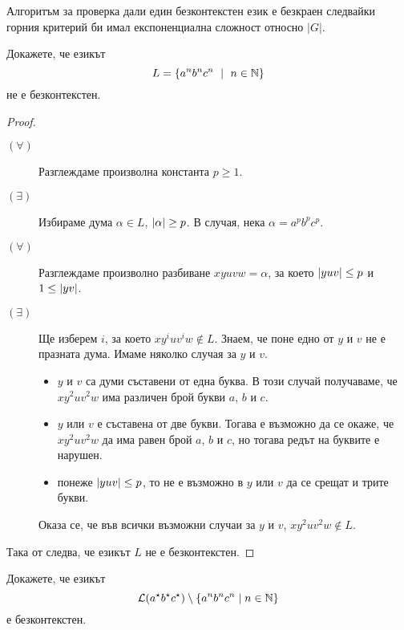 \begin{remark}
  Алгоритъм за проверка дали един безконтекстен език е безкраен следвайки горния критерий би 
  имал експоненциална сложност относно $|G|$.
\end{remark}

\begin{problem}
  \label{prob:anbncn}
  Докажете, че езикът 
  \[L = \{a^nb^nc^n\ \mid\ n\in\Nat\}\]
  не е безконтекстен.
\end{problem}
\begin{proof}
  \begin{description}
  \item[$(\forall)$]
    Разглеждаме произволна константа $p \geq 1$.
  \item[$(\exists)$]
    Избираме дума $\alpha \in L$, $\vert{\alpha}\vert \geq p$.
    В случая, нека $\alpha = a^pb^pc^p$.
  \item[$(\forall)$]
    Разглеждаме произволно разбиване $xyuvw = \alpha$, за което $\vert{yuv}\vert \leq p$ и $1 \leq \vert{yv}\vert$.
  \item[$(\exists)$]
    Ще изберем $i$, за което $xy^iuv^iw \not\in L$.
    Знаем, че поне едно от $y$ и $v$ не е празната дума.
    Имаме няколко случая за $y$ и $v$.
    \begin{itemize}
    \item
      $y$ и $v$ са думи съставени от една буква.
      В този случай получаваме, че $xy^2uv^2w$ има различен брой букви $a$, $b$ и $c$.
    \item
      $y$ или $v$ е съставена от две букви.
      Тогава е възможно да се окаже, че $xy^2uv^2w$ да има равен брой $a$, $b$ и $c$,
      но тогава редът на буквите е нарушен.
    \item
      понеже $\vert{yuv}\vert \leq p$, то не е възможно в $y$ или $v$ да се срещат и трите букви.
    \end{itemize}  
    Оказа се, че във всички възможни случаи за $y$ и $v$, 
    $xy^2uv^2w \not\in L$.
  \end{description}
  Така от  следва, че езикът $L$ не е безконтекстен.
\end{proof}

\begin{problem}
  Докажете, че езикът
  \[\mathcal{L}(a^\star b^\star c^\star) \setminus \{a^nb^nc^n \mid n \in \mathbb{N}\}\]
  е безконтекстен.
\end{problem}

